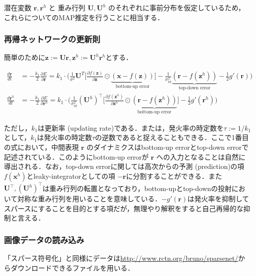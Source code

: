 潜在変数 $\mathbf{r}, \mathbf{r}^h$ と 重み行列 $\mathbf{U}, \mathbf{U}^h$ のそれぞれに事前分布を仮定しているため，これらについてのMAP推定を行うことに相当する．

\subsubsection{再帰ネットワークの更新則}
簡単のために$\mathbf{z}:=\mathbf{U}\mathbf{r}, \mathbf{z}^h:=\mathbf{U}^h\mathbf{r}^h$とする．


\begin{align}
\frac{d \mathbf{r}}{d t}&=-\frac{k_{1}}{2} \frac{\partial E}{\partial \mathbf{r}}=k_{1}\cdot\Bigg(\frac{1}{\sigma^{2}} \mathbf{U}^{T}\bigg[\frac{\partial f(\mathbf{z})}{\partial \mathbf{z}}\odot\underbrace{(\mathbf{x}-f(\mathbf{z}))}_{\text{bottom-up error}}\bigg]-\frac{1}{\sigma_{t d}^{2}}\underbrace{\left(\mathbf{r}-f(\mathbf{z}^h)\right)}_{\text{top-down error}}-\frac{1}{2}g'(\mathbf{r})\Bigg)\\
\frac{d \mathbf{r}^h}{d t}&=-\frac{k_{1}}{2} \frac{\partial E}{\partial \mathbf{r}^h}=k_{1}\cdot\Bigg(\frac{1}{\sigma_{t d}^{2}}(\mathbf{U}^h)^\top\bigg[\frac{\partial f(\mathbf{z}^h)}{\partial \mathbf{z}^h}\odot\underbrace{\left(\mathbf{r}-f(\mathbf{z}^h)\right)}_{\text{bottom-up error}}\bigg]-\frac{1}{2}g'(\mathbf{r}^h)\Bigg)
\end{align}


ただし，$k_1$は更新率 (updating rate)である．または，発火率の時定数を$\tau:=1/k_1$として，$k_1$は発火率の時定数$\tau$の逆数であると捉えることもできる．ここで1番目の式において，中間表現 $\mathbf{r}$ のダイナミクスはbottom-up errorとtop-down errorで記述されている．このようにbottom-up errorが $\mathbf{r}$ への入力となることは自然に導出される．なお，top-down errorに関しては高次からの予測 (prediction)の項 $f(\mathbf{x}^h)$とleaky-integratorとしての項 $-\mathbf{r}$に分割することができる．また$\mathbf{U}^\top, (\mathbf{U}^h)^\top$は重み行列の転置となっており，bottom-upとtop-downの投射において対称な重み行列を用いることを意味している．$-g'(\mathbf{r})$は発火率を抑制してスパースにすることを目的とする項だが，無理やり解釈をすると自己再帰的な抑制と言える．
\subsubsection{画像データの読み込み}
「スパース符号化」と同様にデータは\url{http://www.rctn.org/bruno/sparsenet/}からダウンロードできるファイルを用いる．

